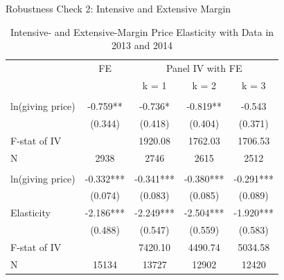 \documentclass[
  ignorenonframetext,
]{beamer}
\begin{document}
\begin{frame}{Robustness Check 2: Intensive and Extensive Margin}
\protect\hypertarget{robustness-check-2-intensive-and-extensive-margin}{}
\begin{table}

\caption{\label{tab:kableShortEstimateElasticityIntExt}Intensive- and Extensive-Margin Price Elasticity with Data in 2013 and 2014}
\centering
\fontsize{9}{11}\selectfont
\begin{tabular}[t]{lcccc}
\toprule
\multicolumn{1}{c}{ } & \multicolumn{1}{c}{FE} & \multicolumn{3}{c}{Panel IV with FE} \\
\cmidrule(l{3pt}r{3pt}){2-2} \cmidrule(l{3pt}r{3pt}){3-5}
 &  & k = 1 & k = 2 & k = 3\\
\midrule
\addlinespace[0.3em]
\multicolumn{5}{l}{\textbf{Intensive Margin}}\\
\hspace{1em}ln(giving price) & -0.759** & -0.736* & -0.819** & -0.543\\
\hspace{1em} & (0.344) & (0.418) & (0.404) & (0.371)\\
\hspace{1em}F-stat of IV &  & 1920.08 & 1762.03 & 1706.53\\
\hspace{1em}N & 2938 & 2746 & 2615 & 2512\\
\addlinespace[0.3em]
\multicolumn{5}{l}{\textbf{Extensive Margin}}\\
\hspace{1em}ln(giving price) & -0.332*** & -0.341*** & -0.380*** & -0.291***\\
\hspace{1em} & (0.074) & (0.083) & (0.085) & (0.089)\\
\hspace{1em}Elasticity & -2.186*** & -2.249*** & -2.504*** & -1.920***\\
\hspace{1em} & (0.488) & (0.547) & (0.559) & (0.583)\\
\hspace{1em}F-stat of IV &  & 7420.10 & 4490.74 & 5034.58\\
\hspace{1em}N & 15134 & 13727 & 12902 & 12420\\
\bottomrule
\end{tabular}
\end{table}
\end{frame}
\end{document}

